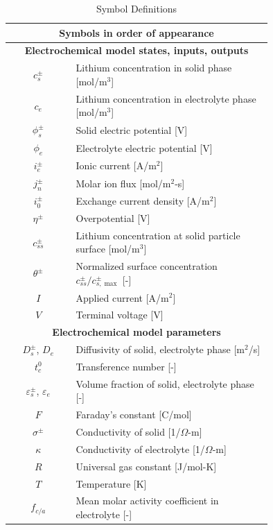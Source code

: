 \documentclass[12pt]{article}
\begin{document}
\renewcommand{\arraystretch}{1.1}
\begin{table}[h]
\caption{Symbol Definitions}
\begin{center}
\begin{tabular}{c | p{0.75\linewidth}}
\multicolumn{2}{c}{Symbols in order of appearance} \\ [1ex]
\hline \hline
\multicolumn{2}{c}{\textbf{Electrochemical model states, inputs, outputs}} \\
\hline
$c_{s}^{\pm}$ & Lithium concentration in solid phase [mol/m$^{3}$] \\
$c_{e}$ & Lithium concentration in electrolyte phase [mol/m$^{3}$] \\
$\phi_{s}^{\pm}$ & Solid electric potential [V] \\
$\phi_{e}$ & Electrolyte electric potential [V] \\
$i_{e}^{\pm}$ & Ionic current [A/m$^{2}$] \\
$j_{n}^{\pm}$ & Molar ion flux [mol/m$^{2}$-s] \\
$i_{0}^{\pm}$ & Exchange current density [A/m$^{2}$] \\
$\eta^{\pm}$ & Overpotential [V] \\
$c_{ss}^{\pm}$ & Lithium concentration at solid particle surface [mol/m$^{3}$] \\
$\theta^{\pm}$ & Normalized surface concentration $c_{ss}^{\pm}/c_{s,\max}^{\pm}$ [-] \\
$I$ & Applied current [A/m$^{2}$] \\
$V$ & Terminal voltage [V] \\
\hline
\multicolumn{2}{c}{\textbf{Electrochemical model parameters}} \\
\hline
$D_{s}^{\pm}$, $D_{e}$ & Diffusivity of solid, electrolyte phase [m$^{2}$/s] \\
$t_{c}^{0}$ & Transference number [-] \\
$\varepsilon_{s}^{\pm}$, $\varepsilon_{e}$ & Volume fraction of solid, electrolyte phase [-] \\
$F$ & Faraday's constant [C/mol] \\
$\sigma^{\pm}$ & Conductivity of solid [1/$\Omega$-m] \\
$\kappa$ & Conductivity of electrolyte [1/$\Omega$-m] \\
$R$ & Universal gas constant [J/mol-K] \\
$T$ & Temperature [K] \\
$f_{c/a}$ & Mean molar activity coefficient in electrolyte [-] \\

\end{tabular}
\end{center}
\end{table}
\end{document}
